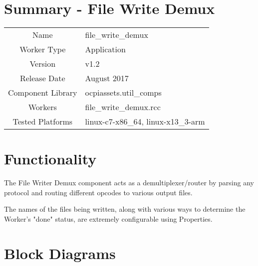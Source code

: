 \documentclass{article}
\author{} %
\date{Version \docVersion} %
\title{\docTitle}
\def\docVersion{1.2}
\def\comp{file\_write\_demux}
\def\Comp{File Write Demux}
\begin{document}
\section*{Summary - \Comp}
\begin{tabular}{|c|M{13.5cm}|}
  \hline
                    &                            \\
  \hline
  Name              & \comp                      \\
  \hline
	Worker Type       & Application                \\
  \hline
	Version           & v\docVersion \\
  \hline
	Release Date      & August 2017 \\
  \hline
  Component Library & ocpiassets.util\_comps     \\
  \hline
  Workers           & \comp.rcc                  \\
  \hline
  Tested Platforms  & linux-c7-x86\_64, linux-x13\_3-arm \\
  \hline
\end{tabular}
\section*{Functionality}
\begin{flushleft}
	The File Writer Demux component acts as a demultiplexer/router by parsing any protocol and routing different opcodes to various output files.\par\medskip
	The names of the files being written, along with various ways to determine the Worker's "done" status, are extremely configurable using Properties.
\end{flushleft}

\section*{Block Diagrams}
\end{document}
